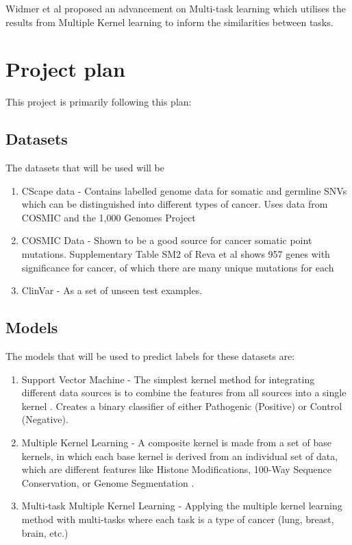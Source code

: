 \documentclass[11pt]{article}
\begin{document}
Widmer et al \cite{Widmer2015} proposed an advancement on Multi-task learning which utilises the results from Multiple Kernel learning to inform the similarities between tasks.

\section{Project plan}

This project is primarily following this plan:

\subsection{Datasets}

The datasets that will be used will be
\begin{enumerate}
	\item CScape data \cite{Rogers2017} - Contains labelled genome data for somatic and germline SNVs which can be distinguished into different types of cancer. Uses data from COSMIC and the 1,000 Genomes Project \cite{Gibbs2015}
	\item COSMIC Data - Shown to be a good source for cancer somatic point mutations.  Supplementary Table SM2 of Reva et al\cite{Reva2011} shows 957 genes with significance for cancer, of which there are many unique mutations for each
	\item ClinVar\cite{Landrum2014} - As a set of unseen test examples.
\end{enumerate}


\subsection{Models}
The models that will be used to predict labels for these datasets are:

\begin{enumerate}
	\item Support Vector Machine - The simplest kernel method for integrating different data sources is to combine the features from all sources into a single kernel \cite{Rogers2017}. Creates a binary classifier of either Pathogenic (Positive) or Control (Negative).
	\item Multiple Kernel Learning - A composite kernel is made from a set of base kernels, in which each base kernel is derived from an individual set of data, which are different features like Histone Modifications, 100-Way Sequence Conservation, or Genome Segmentation \cite{Shihab2015}.
	\item Multi-task Multiple Kernel Learning\cite{Widmer2015} - Applying the multiple kernel learning method with multi-tasks where each task is a type of cancer (lung, breast, brain, etc.)
\end{enumerate}
\end{document}
